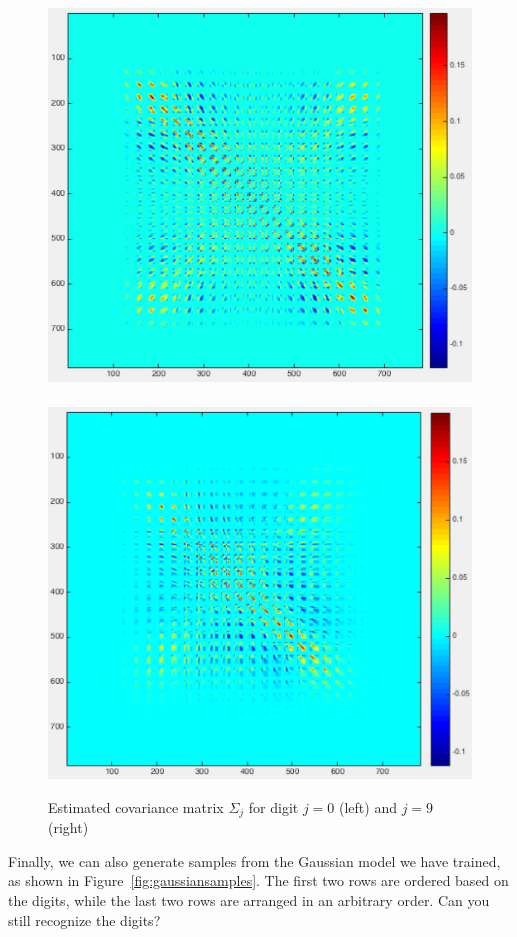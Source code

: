 \documentclass[11pt]{article}
\begin{document}
\begin{figure}[h!]
\centering
\includegraphics[scale=0.42]{cov0} ~~~~~~
\includegraphics[scale=0.42]{cov9}
\caption{Estimated covariance matrix $\Sigma_j$ for digit $j = 0$ (left) and $j = 9$ (right)}
\label{fig:covgaussian}
\end{figure}


Finally, we can also generate samples from the Gaussian model we have trained, as shown in Figure~\ref{fig:gaussiansamples}. The first two rows are ordered based on the digits, while the last two rows are arranged in an arbitrary order. Can you still recognize the digits?
\end{document}
